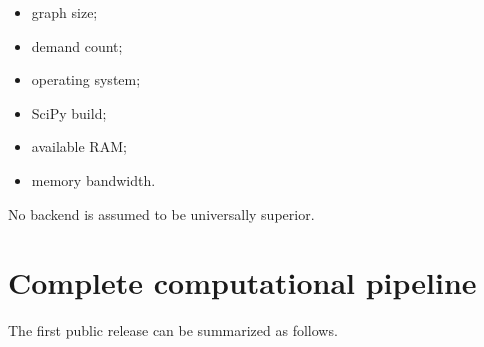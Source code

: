 \documentclass[11pt]{article}
\begin{document}
\begin{itemize}[leftmargin=1.5em]
\item graph size;
\item demand count;
\item operating system;
\item SciPy build;
\item available RAM;
\item memory bandwidth.
\end{itemize}

No backend is assumed to be universally superior.

\section{Complete computational pipeline}

The first public release can be summarized as follows.
\end{document}
